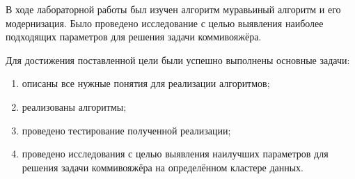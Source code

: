 
В ходе лабораторной работы был изучен алгоритм муравьиный алгоритм и его модернизация. Было проведено исследование с целью выявления наиболее подходящих параметров для решения задачи коммивояжёра.   

Для достижения поставленной цели были успешно выполнены основные задачи: 
\begin{enumerate}
	\item описаны все нужные понятия для реализации алгоритмов;
	\item реализованы алгоритмы;
	\item проведено тестирование полученной реализации;
	\item проведено исследования с целью выявления наилучших параметров для решения задачи коммивояжёра на определённом кластере данных.
\end{enumerate}
